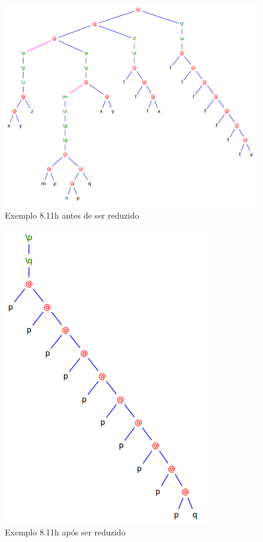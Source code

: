 \documentclass[a4paper]{article}
\begin{document}
\begin{figure}[h]
  \centering
  \includegraphics[scale=0.5]{8-11h_1.png}
  \caption{Exemplo 8.11h antes de ser reduzido}
\end{figure}

\begin{figure}[h]
  \centering
  \includegraphics[scale=0.5]{8-11h_2.png}
  \caption{Exemplo 8.11h após  ser reduzido}
\end{figure}

\FloatBarrier
\end{document}
